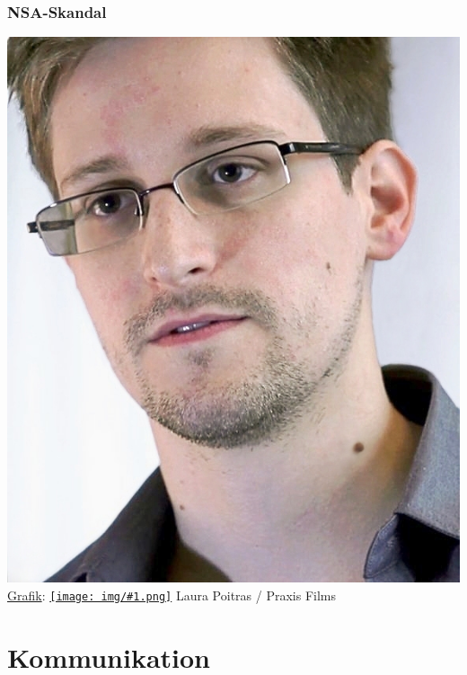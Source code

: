 \documentclass[12pt]{beamer}
\newcommand{\cc}[1]{\texttt{[image: img/\#1.png]}\hspace{1mm}}
\begin{document}
\begin{frame}
    \frametitle{NSA-Skandal}
    \includegraphics[height=0.7\textheight]{img/snowden.jpg}
    \\{\small \href{https://commons.wikimedia.org/wiki/File:Edward_Snowden.jpg\#mediaviewer/File:Edward_Snowden-2.jpg}{Grafik}: \href{https://creativecommons.org/licenses/by/3.0/}{\cc{by}} Laura Poitras / Praxis Films}
\end{frame}

\section{Kommunikation}
\subsection{}
\end{document}
